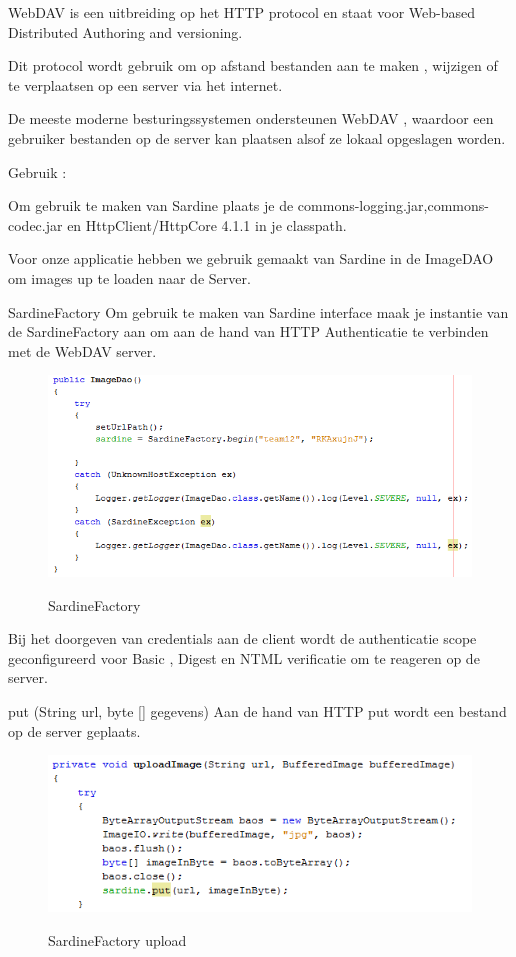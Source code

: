\documentclass[pdftex,a4paper,12pt,twoside]{report}
\begin{document}
WebDAV is een uitbreiding op het HTTP protocol en staat voor Web-based Distributed Authoring and versioning.

Dit protocol wordt gebruik om op afstand bestanden aan te maken , wijzigen of te verplaatsen op een server via het internet.

De meeste moderne besturingssystemen ondersteunen WebDAV , waardoor een gebruiker bestanden op de server kan plaatsen alsof ze lokaal opgeslagen worden.

Gebruik :

Om gebruik te maken van Sardine plaats je de commons-logging.jar,commons-codec.jar en HttpClient/HttpCore 4.1.1 in je classpath.

Voor onze applicatie hebben we gebruik gemaakt van Sardine in de ImageDAO om images up te loaden naar de Server.


SardineFactory
Om gebruik te maken van Sardine interface maak je instantie van de SardineFactory aan om aan de hand van HTTP Authenticatie te verbinden met de WebDAV server.

\begin{figure}[!htb]
\includegraphics{images/Sardine.png}\\
\caption{SardineFactory}
\end{figure}

Bij het doorgeven van credentials aan de client wordt de authenticatie scope geconfigureerd voor Basic , Digest en NTML verificatie om te reageren op de server.

put (String url, byte [] gegevens)
Aan de hand van HTTP put wordt een bestand op de server geplaats.

\begin{figure}[!htb]
\includegraphics{images/sardineupload.png}\\
\caption{SardineFactory upload}
\end{figure}
\end{document}

